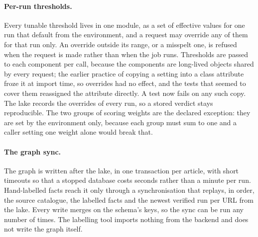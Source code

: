 \paragraph{Per-run thresholds.} Every tunable threshold lives in one
module, as a set of effective values for one run that default from the
environment, and a request may override any of them for that run only.
An override outside its range, or a misspelt one, is refused when the
request is made rather than when the job runs. Thresholds are passed to
each component per call, because the components are long-lived objects
shared by every request; the earlier practice of copying a setting into
a class attribute froze it at import time, so overrides had no effect,
and the tests that seemed to cover them reassigned the attribute
directly. A test now fails on any such copy. The lake records the
overrides of every run, so a stored verdict stays reproducible. The two
groups of scoring weights are the declared exception: they are set by
the environment only, because each group must sum to one and a caller
setting one weight alone would break that.

\paragraph{The graph sync.} The graph is written after the lake, in one
transaction per article, with short timeouts so that a stopped database
costs seconds rather than a minute per run. Hand-labelled facts reach
it only through a synchronisation that replays, in order, the source
catalogue, the labelled facts and the newest verified run per URL from
the lake. Every write merges on the schema's keys, so the sync can be
run any number of times. The labelling tool imports nothing from the
backend and does not write the graph itself.
